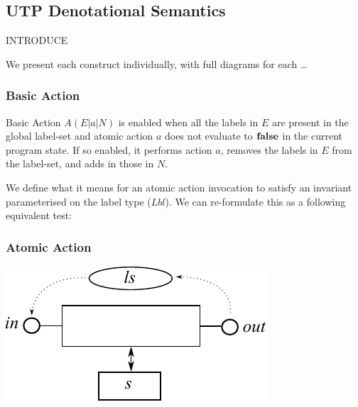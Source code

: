 \subsection{UTP Denotational Semantics}

INTRODUCE

We present each construct individually,
with full diagrams for each \dots



\subsubsection{Basic Action}

Basic Action $A(E|a|N)$ is enabled when all the labels in $E$
are present in the global label-set
and atomic action $a$ does not evaluate to $\mathbf{false}$
in the current program state.
If so enabled,  it performs action $a$, removes the labels in $E$
from the label-set, and adds in those in $N$.


We define what it means for an atomic action invocation
to satisfy an invariant parameterised on the label type ($Lbl$).
We can re-formulate this as a following equivalent test:



\newpage
\subsubsection{Atomic Action}

\includegraphics{images/atomic-action}


